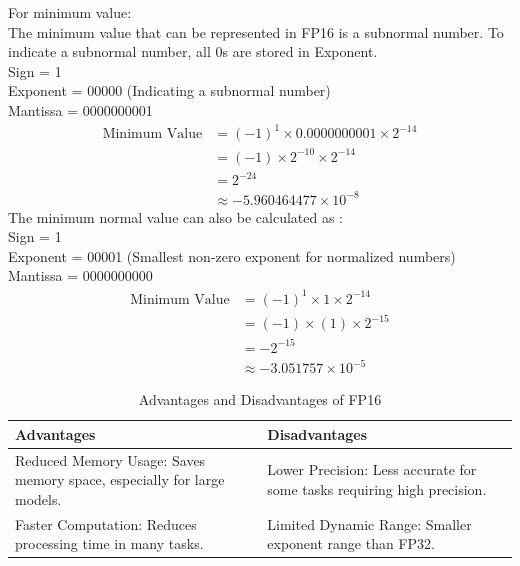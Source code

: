 \begin{enumerate}[label=\textbf{\roman*.}]
    For minimum value:\\
    The minimum value that can be represented in FP16 is a subnormal number. To indicate a subnormal number, all 0s are stored in Exponent. \\
    Sign = 1 \\
    Exponent = 00000 (Indicating a subnormal number)\\
    Mantissa = 0000000001
    \[
        \begin{aligned}
            \text{Minimum Value} &= (-1)^{1} \times 0.0000000001 \times 2^{-14} \\
            & = (-1) \times 2^{-10} \times 2^{-14} \\
            & =  2^{-24} \\
            & \approx -5.960464477 \times 10^{-8}
        \end{aligned}
    \]
    The minimum normal value can also be calculated as : \\
    Sign = 1 \\
    Exponent = 00001 (Smallest non-zero exponent for normalized numbers)\\
    Mantissa = 0000000000
    \[
        \begin{aligned}
            \text{Minimum Value} &= (-1)^{1} \times 1 \times 2^{-14} \\
            & = (-1) \times (1) \times 2^{-15} \\
            & =  -2^{-15} \\
            & \approx -3.051757 \times 10^{-5}
        \end{aligned}
    \]

 
    \begin{table}[H]
        \centering
        \caption{Advantages and Disadvantages of FP16}
        \label{tab:fp16}
        \begin{tabular}{|p{6cm}|p{6cm}|}
        \hline
        \textbf{Advantages} & \textbf{Disadvantages} \\
        \hline
        Reduced Memory Usage: Saves memory space, especially for large models. & Lower Precision: Less accurate for some tasks requiring high precision. \\
        \hline
        Faster Computation: Reduces processing time in many tasks. & Limited Dynamic Range: Smaller exponent range than FP32. \\
        \hline
        \end{tabular}
    \end{table}


\end{enumerate}
